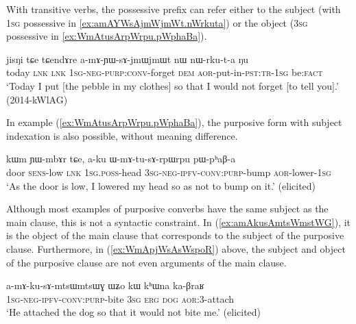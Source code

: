 With transitive verbs, the possessive prefix can refer either to the subject (with \textsc{1sg} possessive  in \ref{ex:amAYWsAjmWjmWt.nWrkuta}) or the object (\textsc{3sg} possessive  in \ref{ex:WmAtusArpWrpu.pWphaBa}).

\begin{exe}
\ex \label{ex:amAYWsAjmWjmWt.nWrkuta}
\gll jisŋi tɕe tɕendɤre a-mɤ-ɲɯ-sɤ-jmɯ\redp{}jmɯt nɯ nɯ-rku-t-a ŋu \\
today \textsc{lnk} \textsc{lnk} \textsc{1sg}-\textsc{neg}-\textsc{purp}:\textsc{conv}-forget \textsc{dem} \textsc{aor}-put-in-\textsc{pst}:\textsc{tr}-\textsc{1sg} be:\textsc{fact} \\
\glt `Today I put [the pebble in my clothes] so that I would not forget [to tell you].' (2014-kWlAG)
\end{exe}

In example (\ref{ex:WmAtusArpWrpu.pWphaBa}), the purposive form  with subject indexation is also possible, without meaning difference.

\begin{exe}
\ex \label{ex:WmAtusArpWrpu.pWphaBa}
\gll kɯm ɲɯ-mbɤr tɕe, a-ku ɯ-mɤ-tu-sɤ-rpɯ\redp{}rpu pɯ-pʰaβ-a \\
door \textsc{sens}-low \textsc{lnk} \textsc{1sg}.\textsc{poss}-head \textsc{3sg}-\textsc{neg}-\textsc{ipfv}-\textsc{conv}:\textsc{purp}-bump \textsc{aor}-lower-\textsc{1sg}\\
\glt `As the door is low, I lowered my head so as not to bump on it.' (elicited)
\end{exe}

Although most examples of purposive converbs have the same subject as the main clause, this is not a syntactic constraint. In (\ref{ex:amAkusAmtsWmstWG}), it is the object of the main clause  that corresponds to the subject of the purposive clause. Furthermore, in (\ref{ex:WmApjWsAsWspoR}) above, the subject and object of the purposive clause are not even arguments of the main clause.

\begin{exe}
\ex \label{ex:amAkusAmtsWmstWG}
\gll  a-mɤ-ku-sɤ-mtsɯ\redp{}mtsɯɣ ɯʑo kɯ kʰɯna ka-βraʁ \\
\textsc{1sg}-\textsc{neg}-\textsc{ipfv}-\textsc{conv}:\textsc{purp}-bite \textsc{3sg} \textsc{erg} \textsc{dog} \textsc{aor}:3\flobv{}-attach \\
\glt `He attached the dog so that it would not bite me.' (elicited)
\end{exe}

